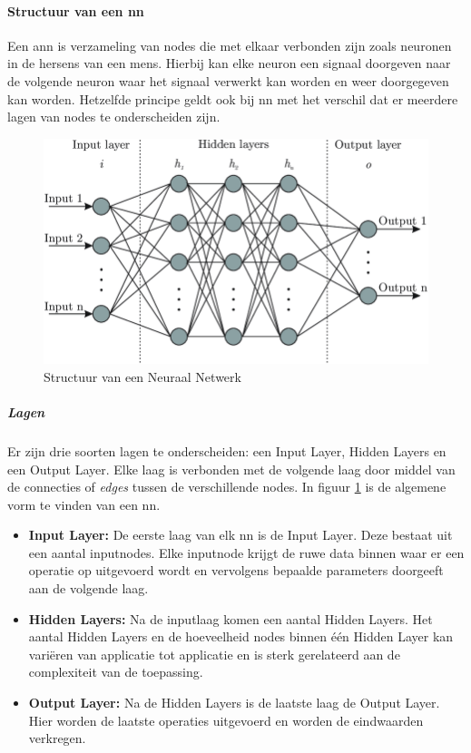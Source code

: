 		\paragraph{Structuur van een \gls{nn}}
		Een \gls{ann} is verzameling van nodes die met elkaar verbonden zijn zoals neuronen in de hersens van een mens. Hierbij kan elke neuron een signaal doorgeven naar de volgende neuron waar het signaal verwerkt kan worden en weer doorgegeven kan worden. Hetzelfde principe geldt ook bij \gls{nn} met het verschil dat er meerdere lagen van nodes te onderscheiden zijn. 
	
		\begin{figure}
			\centering
			\includegraphics[width=140mm]{afbeeldingen/neuralNetwork2.PNG}
			\caption{Structuur van een Neuraal Netwerk}
			\label{fig:neuralNetworkStructuur}
		\end{figure}
		
			\subparagraph{Lagen}
			Er zijn drie soorten lagen te onderscheiden: een Input Layer, Hidden Layers en een Output Layer. Elke laag is verbonden met de volgende laag door middel van de connecties of \textit{edges} tussen de verschillende nodes. In figuur \ref{fig:neuralNetworkStructuur} is de algemene vorm te vinden van een \gls{nn}.
		
				\begin{itemize}
					\item \textbf{Input Layer:} De eerste laag van elk \gls{nn} is de Input Layer. Deze bestaat uit een aantal inputnodes. Elke inputnode krijgt de ruwe data binnen waar er een operatie op uitgevoerd wordt en vervolgens bepaalde parameters doorgeeft aan de volgende laag. 
					\item \textbf{Hidden Layers:}  Na de inputlaag komen een aantal Hidden Layers. Het aantal Hidden Layers en de hoeveelheid nodes binnen \'e\'en Hidden Layer kan vari\"eren van applicatie tot applicatie en is sterk gerelateerd aan de complexiteit van de toepassing.
					\item \textbf{Output Layer:} Na de Hidden Layers is de laatste laag de Output Layer. Hier worden de laatste operaties uitgevoerd en worden de eindwaarden verkregen.
				\end{itemize}
			
